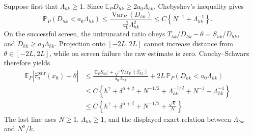 Suppose first that \(\Lambda_{hk}\geq1\).  Since \(\mathbb E_P D_{hk}\geq2a_0\Lambda_{hk}\), Chebyshev's inequality gives
\[
 \mathbb P_P(D_{hk}<a_0\Lambda_{hk})
 \leq\frac{\operatorname{Var}_P(D_{hk})}{a_0^2\Lambda_{hk}^2}
 \leq C\left\{N^{-1}+\Lambda_{hk}^{-1}\right\}.
\]
On the successful screen, the untruncated ratio obeys
\(T_{hk}/D_{hk}-\theta=S_{hk}/D_{hk}\), and \(D_{hk}\geq a_0\Lambda_{hk}\).  Projection onto \([-2L,2L]\) cannot increase distance from \(\theta\in[-2L,2L]\), while on screen failure the raw estimate is zero.  Cauchy--Schwarz therefore yields
\[
\begin{split}
 \mathbb E_P\left|\widehat\tau_n^{\mathrm{pair}}(x_0)-\theta\right|
 &\leq \frac{|\mathbb E_P S_{hk}|+\sqrt{\operatorname{Var}_P(S_{hk})}}{a_0\Lambda_{hk}}
       +2L\,\mathbb P_P(D_{hk}<a_0\Lambda_{hk})\\
 &\leq C\left\{h^\gamma+\delta^{\alpha+\beta}+N^{-1/2}+\Lambda_{hk}^{-1/2}
       +N^{-1}+\Lambda_{hk}^{-1}\right\}\\
 &\leq C\left\{h^\gamma+\delta^{\alpha+\beta}+N^{-1/2}+\frac{\sqrt{k}}{N}\right\}.
\end{split}
\]
The last line uses \(N\geq1\), \(\Lambda_{hk}\geq1\), and the displayed exact relation between \(\Lambda_{hk}\) and \(N^2/k\).

